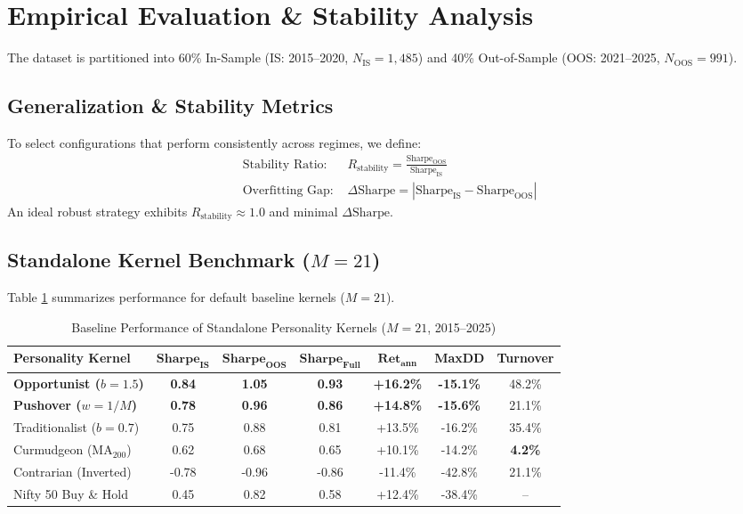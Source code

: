\documentclass[11pt,a4paper]{article}
\begin{document}
\section{Empirical Evaluation \& Stability Analysis}

The dataset is partitioned into 60\% In-Sample (IS: 2015--2020, $N_{\text{IS}} = 1,485$) and 40\% Out-of-Sample (OOS: 2021--2025, $N_{\text{OOS}} = 991$).

\subsection{Generalization \& Stability Metrics}
To select configurations that perform consistently across regimes, we define:
\begin{align}
    \text{Stability Ratio: } & R_{\text{stability}} = \frac{\text{Sharpe}_{\text{OOS}}}{\text{Sharpe}_{\text{IS}}} \\
    \text{Overfitting Gap: } & \Delta \text{Sharpe} = |\text{Sharpe}_{\text{IS}} - \text{Sharpe}_{\text{OOS}}|
\end{align}
An ideal robust strategy exhibits $R_{\text{stability}} \approx 1.0$ and minimal $\Delta \text{Sharpe}$.

\subsection{Standalone Kernel Benchmark ($M=21$)}
Table \ref{tab:standalone_summary} summarizes performance for default baseline kernels ($M=21$).

\begin{table}[htbp]
\centering
\caption{Baseline Performance of Standalone Personality Kernels ($M=21$, 2015--2025)}
\label{tab:standalone_summary}
\begin{tabular}{lcccccc}
\toprule
\textbf{Personality Kernel} & $\mathbf{\text{Sharpe}_{\text{IS}}}$ & $\mathbf{\text{Sharpe}_{\text{OOS}}}$ & $\mathbf{\text{Sharpe}_{\text{Full}}}$ & $\mathbf{\text{Ret}_{\text{ann}}}$ & \textbf{MaxDD} & \textbf{Turnover} \\
\midrule
\textbf{Opportunist ($b=1.5$)} & \textbf{0.84} & \textbf{1.05} & \textbf{0.93} & \textbf{+16.2\%} & \textbf{-15.1\%} & 48.2\% \\
\textbf{Pushover ($w=1/M$)} & \textbf{0.78} & \textbf{0.96} & \textbf{0.86} & \textbf{+14.8\%} & \textbf{-15.6\%} & 21.1\% \\
Traditionalist ($b=0.7$) & 0.75 & 0.88 & 0.81 & +13.5\% & -16.2\% & 35.4\% \\
Curmudgeon ($\text{MA}_{200}$) & 0.62 & 0.68 & 0.65 & +10.1\% & -14.2\% & \textbf{4.2\%} \\
Contrarian (Inverted) & -0.78 & -0.96 & -0.86 & -11.4\% & -42.8\% & 21.1\% \\
Nifty 50 Buy \& Hold & 0.45 & 0.82 & 0.58 & +12.4\% & -38.4\% & -- \\
\bottomrule
\end{tabular}
\end{table}
\end{document}
